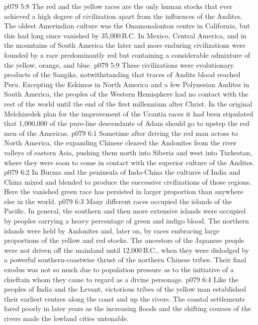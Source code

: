 \vs p079 5:8 The red and the yellow races are the only human stocks that ever achieved a high degree of civilization apart from the influences of the Andites. The oldest Amerindian culture was the Onamonalonton centre in California, but this had long since vanished by 35,000\,B.C. In Mexico, Central America, and in the mountains of South America the later and more enduring civilizations were founded by a race predominantly red but containing a considerable admixture of the yellow, orange, and blue.
\vs p079 5:9 These civilizations were evolutionary products of the Sangiks, notwithstanding that traces of Andite blood reached Peru. Excepting the Eskimos in North America and a few Polynesian Andites in South America, the peoples of the Western Hemisphere had no contact with the rest of the world until the end of the first millennium after Christ. In the original Melchizedek plan for the improvement of the Urantia races it had been stipulated that 1,000,000 of the pure\hyp{}line descendants of Adam should go to upstep the red men of the Americas.
\vs p079 6:1 Sometime after driving the red man across to North America, the expanding Chinese cleared the Andonites from the river valleys of eastern Asia, pushing them north into Siberia and west into Turkestan, where they were soon to come in contact with the superior culture of the Andites.
\vs p079 6:2 In Burma and the peninsula of Indo\hyp{}China the cultures of India and China mixed and blended to produce the successive civilizations of those regions. Here the vanished green race has persisted in larger proportion than anywhere else in the world.
\vs p079 6:3 Many different races occupied the islands of the Pacific. In general, the southern and then more extensive islands were occupied by peoples carrying a heavy percentage of green and indigo blood. The northern islands were held by Andonites and, later on, by races embracing large proportions of the yellow and red stocks. The ancestors of the Japanese people were not driven off the mainland until 12,000\,B.C., when they were dislodged by a powerful southern\hyp{}coastwise thrust of the northern Chinese tribes. Their final exodus was not so much due to population pressure as to the initiative of a chieftain whom they came to regard as a divine personage.
\vs p079 6:4 Like the peoples of India and the Levant, victorious tribes of the yellow man established their earliest centres along the coast and up the rivers. The coastal settlements fared poorly in later years as the increasing floods and the shifting courses of the rivers made the lowland cities untenable.
